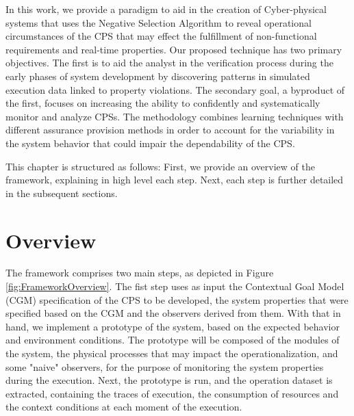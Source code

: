 In this work, we provide a paradigm to aid in the creation of Cyber-physical systems that uses the Negative Selection Algorithm to reveal operational circumstances of the CPS that may effect the fulfillment of non-functional requirements and real-time properties. Our proposed technique has two primary objectives. The first is to aid the analyst in the verification process during the early phases of system development by discovering patterns in simulated execution data linked to property violations. The secondary goal, a byproduct of the first, focuses on increasing the ability to confidently and systematically monitor and analyze CPSs. The methodology combines learning techniques with different assurance provision methods in order to account for the variability in the system behavior that could impair the dependability of the CPS.


This chapter is structured as follows: First, we provide an overview of the framework, explaining in high level each step. Next, each step is further detailed in the subsequent sections.

\section{Overview}




The framework comprises two main steps, as depicted in Figure \ref{fig:FrameworkOverview}.
The fist step uses as input the Contextual Goal Model (CGM) specification of the CPS to be developed, the system properties that were specified based on the CGM and the observers derived from them. With that in hand, we implement a prototype of the system, based on the expected behavior and environment conditions. The prototype will be composed of the modules of the system, the physical processes that may impact the operationalization, and some "naive" observers, for the purpose of monitoring the system properties during the execution. Next, the prototype is run, and the operation dataset is extracted, containing the traces of execution, the consumption of resources and the context conditions at each moment of the execution.

